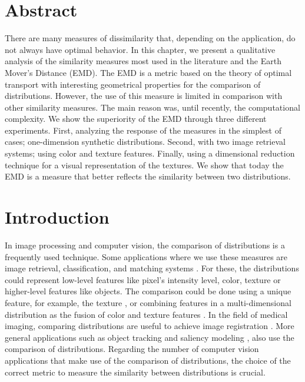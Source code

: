 \section*{Abstract}
\noindent There are many measures of dissimilarity that, depending on the application, do not always have optimal behavior. In this chapter, we present a qualitative analysis of the similarity measures most used in the literature and the Earth Mover's Distance (EMD).  The EMD is a metric based on the theory of optimal transport with interesting geometrical properties for the comparison of distributions. However, the use of this measure is limited in comparison with other similarity measures. The main reason was, until recently, the computational complexity. We show the superiority of the EMD through three different experiments. First, analyzing the response of the measures in the simplest of cases; one-dimension synthetic distributions. Second, with two image retrieval systems; using color and texture features. Finally, using a dimensional reduction technique for a visual representation of the textures. We show that today the EMD is a measure that better reflects the similarity between two distributions.

\section{Introduction}\label{sec:introduction}
In image processing and computer vision, the comparison of distributions is a frequently used technique. Some applications where we use these measures are image retrieval, classification, and matching systems \citep{Smeulders.Worring.ea:PAMI:2000}. For these, the distributions could represent low-level features like pixel's intensity level, color, texture or higher-level features like objects. The comparison could be done using a unique feature, for example, the texture \citep{Banerjee.Bhunia.ea:ESWA:2018, Kwitt.Uhl:ICIP:2008}, or combining features in a multi-dimensional distribution as the fusion of color and texture features \citep{Liu.Guo.ea:IS:2017}. In the field of medical imaging, comparing distributions are useful to achieve image registration \citep{So.Chung:JPR:2017}. More general applications such as object tracking \citep{Nejhum.Ho.ea:CVPR:2008, Klein.Frintrop:CV:2011} and  saliency modeling \citep{Bylinskii.Judd.ea:PAMI:2018}, also use the comparison of distributions. Regarding the number of computer vision applications that make use of the comparison of distributions, the choice of the correct metric to measure the similarity between distributions is crucial. 

